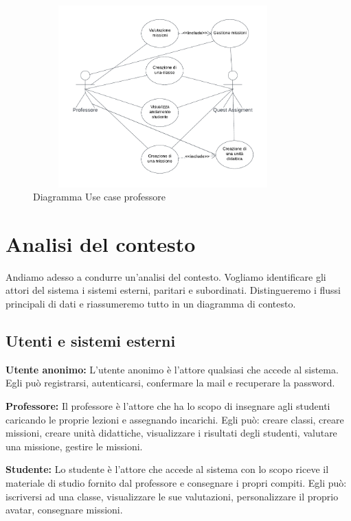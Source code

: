 \begin{figure}[h!]
  \centerline{\includegraphics[trim={0 0.9cm 0 0.9cm},clip ,height= 7cm,width=10cm,angle=0]{figures/professore.pdf}}
  \caption{Diagramma Use case professore}
\end{figure}
















\section{Analisi del contesto}

Andiamo adesso a condurre un'analisi del contesto. Vogliamo identificare gli attori del sistema i sistemi esterni, paritari e subordinati. Distingueremo i flussi principali di dati e riassumeremo tutto in un diagramma di contesto.

\subsection{Utenti e sistemi esterni}

\textbf{Utente anonimo:} L'utente anonimo è l'attore qualsiasi che accede al sistema. Egli può registrarsi, autenticarsi, confermare la mail e recuperare la password.

\textbf{Professore: }Il professore è l'attore che ha lo scopo di insegnare agli studenti caricando le proprie lezioni e assegnando incarichi. Egli può: creare classi, creare missioni, creare unità didattiche, visualizzare i risultati degli studenti, valutare una missione, gestire le missioni.

\textbf{Studente: }Lo studente è l'attore che accede al sistema con lo scopo riceve il materiale di studio fornito dal professore e consegnare i propri compiti. Egli può: iscriversi ad una classe, visualizzare le sue valutazioni, personalizzare il proprio avatar, consegnare missioni.

